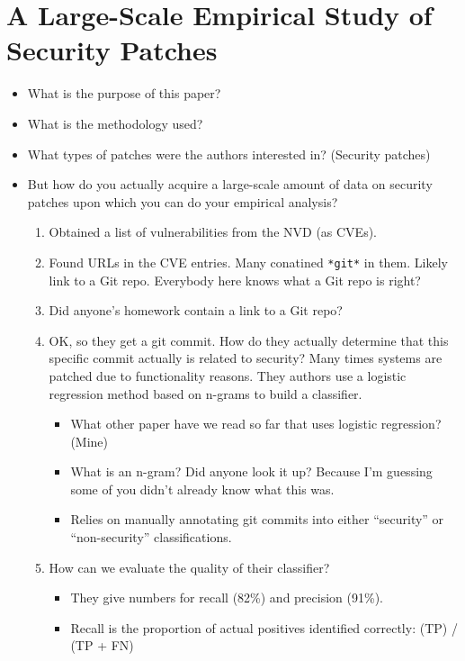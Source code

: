 \documentclass[11pt]{article}
\begin{document}
\section*{A Large-Scale Empirical Study of Security Patches}

\begin{itemize}
    \item What is the purpose of this paper?
    \item What is the methodology used? 
    \item What types of patches were the authors interested in? (Security patches)
    \item But how do you actually acquire a large-scale amount of data on security patches upon which you can do your empirical analysis?
    \begin{enumerate}
        \item Obtained a list of vulnerabilities from the NVD (as CVEs).
        \item Found URLs in the CVE entries. Many conatined \texttt{*git*} in them. Likely link to a Git repo. Everybody here knows what a Git repo is right?
        \item Did anyone's homework contain a link to a Git repo?
        \item OK, so they get a git commit. How do they actually determine that this specific commit actually is related to security? Many times systems are patched due to functionality reasons. They authors use a logistic regression method based on n-grams to build a classifier. 
        \begin{itemize}
            \item What other paper have we read so far that uses logistic regression? (Mine)
            \item What is an n-gram? Did anyone look it up? Because I'm guessing some of you didn't already know what this was.
            \item Relies on manually annotating git commits into either ``security'' or ``non-security'' classifications.
        \end{itemize}
        \item How can we evaluate the quality of their classifier?
        \begin{itemize}
            \item They give numbers for recall (82\%) and precision (91\%). 
            \item Recall is the proportion of actual positives identified correctly: (TP) / (TP + FN)

\end{itemize}
\end{enumerate}
\end{itemize}
\end{document}
